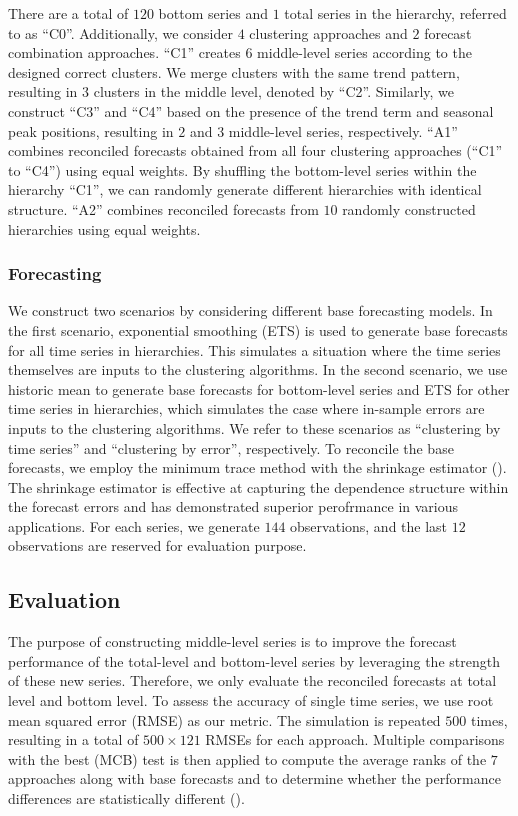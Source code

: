 \documentclass[a4paper,review,12pt,authoryear]{elsarticle}
\begin{document}
There are a total of $120$ bottom series and $1$ total series in the hierarchy, referred to as ``C0''. Additionally, we consider $4$ clustering approaches and $2$ forecast combination approaches. ``C1'' creates $6$ middle-level series according to the designed correct clusters. We merge clusters with the same trend pattern, resulting in $3$ clusters in the middle level, denoted by ``C2''. Similarly, we construct ``C3'' and ``C4'' based on the presence of the trend term and seasonal peak positions, resulting in $2$ and $3$ middle-level series, respectively. ``A1'' combines reconciled forecasts obtained from all four clustering approaches (``C1'' to ``C4'') using equal weights. By shuffling the bottom-level series within the hierarchy ``C1'', we can randomly generate different hierarchies with identical structure. ``A2'' combines reconciled forecasts from $10$ randomly constructed hierarchies using equal weights.

\subsubsection*{Forecasting}

We construct two scenarios by considering different base forecasting models. In the first scenario, exponential smoothing (ETS) is used to generate base forecasts for all time series in hierarchies. This simulates a situation where the time series themselves are inputs to the clustering algorithms.
In the second scenario, we use historic mean to generate base forecasts for bottom-level series and ETS for other time series in hierarchies, which simulates the case where in-sample errors are inputs to the clustering algorithms. We refer to these scenarios as ``clustering by time series'' and ``clustering by error'', respectively. To reconcile the base forecasts, we employ the minimum trace method with the shrinkage estimator (\citealp{wickramasuriyaOptimalForecastReconciliation2019}). The shrinkage estimator is effective at capturing the dependence structure within the forecast errors and has demonstrated superior perofrmance in various applications. For each series, we generate $144$ observations, and the last $12$ observations are reserved for evaluation purpose.


\subsection{Evaluation}
\label{sec:simu_eval}

The purpose of constructing middle-level series is to improve the forecast performance of the total-level and bottom-level series by leveraging the strength of these new series.
Therefore, we only evaluate the reconciled forecasts at total level and bottom level. 
To assess the accuracy of single time series, we use root mean squared error (RMSE) as our metric. 
The simulation is repeated $500$ times, resulting in a total of $500\times 121$ RMSEs for each approach. 
Multiple comparisons with the best (MCB) test is then applied to compute the average ranks of the $7$ approaches along with base forecasts and to determine whether the performance differences are statistically different (\citealp{koningM3CompetitionStatistical2005}).
\end{document}
